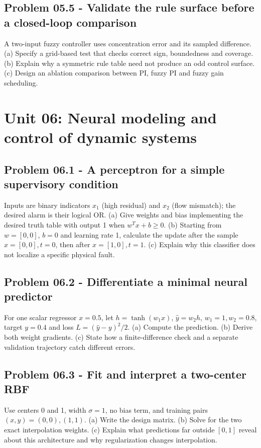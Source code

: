 \documentclass[11pt,a4paper]{article}
\begin{document}
\subsection{Problem 05.5 - Validate the rule surface before a closed-loop comparison}
A two-input fuzzy controller uses concentration error and its sampled difference. (a) Specify a grid-based test that checks correct sign, boundedness and coverage. (b) Explain why a symmetric rule table need not produce an odd control surface. (c) Design an ablation comparison between PI, fuzzy PI and fuzzy gain scheduling.


\clearpage\section{Unit 06: Neural modeling and control of dynamic systems}
\subsection{Problem 06.1 - A perceptron for a simple supervisory condition}
Inputs are binary indicators $x_1$ (high residual) and $x_2$ (flow mismatch); the desired alarm is their logical OR. (a) Give weights and bias implementing the desired truth table with output 1 when $w^Tx+b\geq0$. (b) Starting from $w=[0,0]$, $b=0$ and learning rate 1, calculate the update after the sample $x=[0,0],t=0$, then after $x=[1,0],t=1$. (c) Explain why this classifier does not localize a specific physical fault.

\subsection{Problem 06.2 - Differentiate a minimal neural predictor}
For one scalar regressor $x=0.5$, let $h=\tanh(w_1x)$, $\hat y=w_2h$, $w_1=1,w_2=0.8$, target $y=0.4$ and loss $L=(\hat y-y)^2/2$. (a) Compute the prediction. (b) Derive both weight gradients. (c) State how a finite-difference check and a separate validation trajectory catch different errors.

\subsection{Problem 06.3 - Fit and interpret a two-center RBF}
Use centers 0 and 1, width $\sigma=1$, no bias term, and training pairs $(x,y)=(0,0),(1,1)$. (a) Write the design matrix. (b) Solve for the two exact interpolation weights. (c) Explain what predictions far outside $[0,1]$ reveal about this architecture and why regularization changes interpolation.
\end{document}
